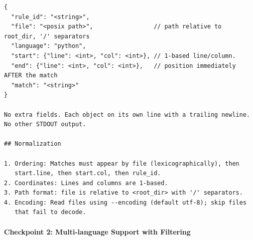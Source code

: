 \begin{lstlisting}[style=specblock, caption={Specification for \texttt{code\_search} checkpoint 1}, label={lst:code-search-cp1}]
{
  "rule_id": "<string>",
  "file": "<posix path>",                 // path relative to root_dir, '/' separators
  "language": "python",
  "start": {"line": <int>, "col": <int>}, // 1-based line/column.
  "end": {"line": <int>, "col": <int>},   // position immediately AFTER the match
  "match": "<string>"
}

No extra fields. Each object on its own line with a trailing newline.
No other STDOUT output.

## Normalization

1. Ordering: Matches must appear by file (lexicographically), then
   start.line, then start.col, then rule_id.
2. Coordinates: Lines and columns are 1-based.
3. Path format: file is relative to <root_dir> with '/' separators.
4. Encoding: Read files using --encoding (default utf-8); skip files
   that fail to decode.
\end{lstlisting}

\paragraph{Checkpoint 2: Multi-language Support with Filtering}
\label{sec:appendix-cp2}

